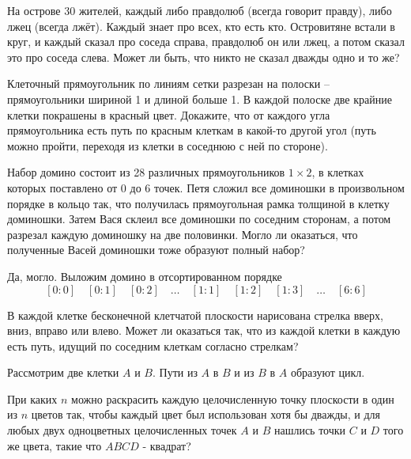 \documentclass[11pt, a4paper]{common/document_template}
\begin{document}
\begin{exercise}[5]
На острове 30 жителей, каждый либо правдолюб (всегда говорит правду), либо лжец (всегда лжёт). Каждый знает про всех, кто есть кто. Островитяне встали в круг, и каждый сказал про соседа
справа, правдолюб он или лжец, а потом сказал это про соседа слева. Может ли быть, что никто не сказал дважды одно и то же?
\end{exercise}

\begin{exercise}[8]
Клеточный прямоугольник по линиям сетки разрезан на полоски – прямоугольники шириной 1 и длиной больше 1. В каждой полоске две крайние клетки покрашены в красный цвет. Докажите, что от каждого угла \\ прямоугольника есть путь по красным клеткам в какой-то другой угол (путь можно пройти, переходя из клетки в соседнюю с ней по стороне).
\end{exercise}

\begin{exercise}[18]
Набор домино состоит из 28 различных прямоугольников $1 \times 2$, в клетках которых поставлено от 0 до 6 точек. Петя сложил все доминошки в произвольном порядке в кольцо так, что получилась прямоугольная рамка толщиной в клетку доминошки. Затем Вася склеил все доминошки по соседним сторонам, а потом разрезал каждую доминошку на две половинки. Могло ли оказаться, что полученные Васей доминошки тоже образуют полный набор?
\end{exercise}

\begin{Solution}
Да, могло. Выложим домино в отсортированном порядке
$$
[0 : 0] \quad [0 : 1] \quad [0 : 2] \quad \dots \quad [1 : 1] \quad [1 : 2] \quad [1 : 3] \quad \dots \quad [6 : 6]
$$
\end{Solution}

\begin{exercise}[25]
В каждой клетке бесконечной клетчатой плоскости нарисована стрелка вверх, вниз, вправо или влево. Может ли оказаться так, что из каждой клетки в каждую есть путь, идущий по соседним клеткам согласно стрелкам?
\end{exercise}

\begin{Solution}
Рассмотрим две клетки $A$ и $B$. Пути из $A$ в $B$ и из $B$ в $A$ образуют цикл. 
\end{Solution}

\begin{exercise}[28]
При каких $n$ можно раскрасить каждую целочисленную точку плоскости в один из $n$ цветов так, чтобы каждый цвет был использован хотя бы дважды, и для любых двух одноцветных целочисленных точек $A$ и $B$ нашлись точки $C$ и $D$ того же цвета, такие что $ABCD$ - квадрат?
\end{exercise}
\end{document}
